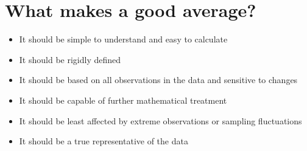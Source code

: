 \documentclass[
10pt, %
a4paper, %
]{report}
\begin{document}
\section*{What makes a good average?}

\begin{itemize}
\item It should be simple to understand and easy to calculate
\item It should be rigidly defined
\item It should be based on all observations in the data and sensitive to changes
\item It should be capable of further mathematical treatment
\item It should be least affected by extreme observations or sampling fluctuations
\item It should be a true representative of the data
\end{itemize}
\end{document}
